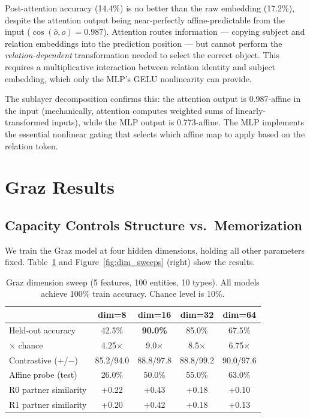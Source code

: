 \documentclass[11pt]{article}
\begin{document}
Post-attention accuracy (14.4\%) is no better than the raw embedding (17.2\%), despite
the attention output being near-perfectly affine-predictable from the input
($\cos(\hat{o}, o) = 0.987$). Attention routes information --- copying subject and
relation embeddings into the prediction position --- but cannot perform the
\emph{relation-dependent} transformation needed to select the correct object. This
requires a multiplicative interaction between relation identity and subject embedding,
which only the MLP's GELU nonlinearity can provide.

The sublayer decomposition confirms this: the attention output is 0.987-affine in the
input (mechanically, attention computes weighted sums of linearly-transformed inputs),
while the MLP output is 0.773-affine. The MLP implements the essential nonlinear gating
that selects which affine map to apply based on the relation token.

\section{Graz Results}

\subsection{Capacity Controls Structure vs.\ Memorization}

We train the Graz model at four hidden dimensions, holding all other parameters fixed.
Table~\ref{tab:graz_dim} and Figure~\ref{fig:dim_sweeps} (right) show the results.

\begin{table}[h]
\centering
\caption{Graz dimension sweep (5 features, 100 entities, 10 types). All models achieve
100\% train accuracy. Chance level is 10\%.}
\label{tab:graz_dim}
\begin{tabular}{lcccc}
\toprule
& dim=8 & dim=16 & dim=32 & dim=64 \\
\midrule
Held-out accuracy & 42.5\% & \textbf{90.0\%} & 85.0\% & 67.5\% \\
$\times$ chance & 4.25$\times$ & 9.0$\times$ & 8.5$\times$ & 6.75$\times$ \\
Contrastive ($+$/$-$) & 85.2/94.0 & 88.8/97.8 & 88.8/99.2 & 90.0/97.6 \\
Affine probe (test) & 26.0\% & 50.0\% & 55.0\% & 63.0\% \\
R0 partner similarity & +0.22 & +0.43 & +0.18 & +0.10 \\
R1 partner similarity & +0.20 & +0.42 & +0.18 & +0.13 \\
\bottomrule
\end{tabular}
\end{table}
\end{document}
